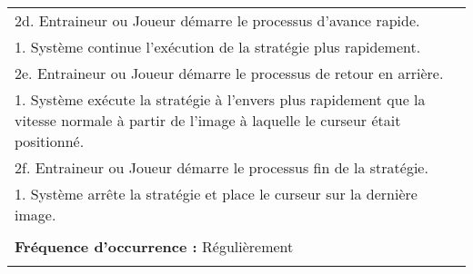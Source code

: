 \begin{longtable}{|p{16cm}|}
	2d. Entraineur ou Joueur démarre le processus d'avance rapide.\\
	\hspace{1cm}1. Système continue l'exécution de la stratégie plus rapidement.\\
	2e. Entraineur ou Joueur démarre le processus de retour en arrière.\\
	\hspace{1cm}1. Système exécute la stratégie à l'envers plus rapidement que la vitesse normale à partir de l'image à laquelle le curseur était positionné.\\
	2f. Entraineur ou Joueur démarre le processus fin de la stratégie.\\
	\hspace{1cm}1. Système arrête la stratégie et place le curseur sur la dernière image.\\
	\\
	\textbf{Fréquence d'occurrence :} Régulièrement\\
	\\
	\hline
\end{longtable}

